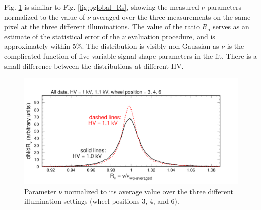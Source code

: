 Fig. \ref{fig:pglobal_Rn} is similar to Fig. \ref{fig:pglobal_Rs}, showing the measured $\nu$ parameters normalized to the value of $\nu$ averaged over the three measurements on the same pixel at the three different illuminations. The value of the ratio $R_{\mathrm{n}}$ serves as an estimate of the statistical error of the $\nu$ evaluation procedure, and is approximately within 5\%. The distribution is visibly non-Gaussian as $\nu$ is the complicated function of five variable signal shape parameters in the fit. There is a small difference between the distributions at different HV.
\begin{figure}[hbt]
	\centering
	\includegraphics[width=0.98\linewidth, trim=0 15 50 35, clip]{figures/pglobal_Rn.pdf}
	\caption{Parameter $\nu$ normalized to its average value over the three different illumination settings (wheel positions 3, 4, and 6).}
	\label{fig:pglobal_Rn}
\end{figure}


